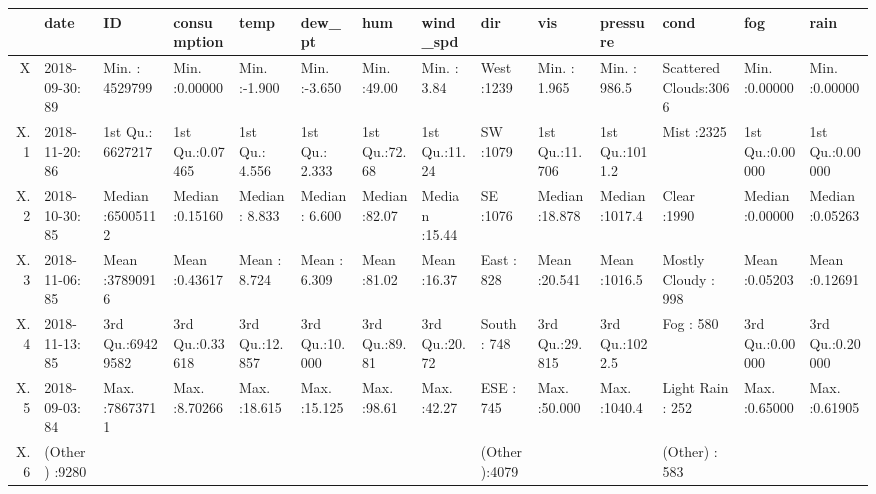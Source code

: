 \begin{table}[ht]
\centering
\begin{tabular}{rlllllllllllll}
  \hline
 &         date &       ID &  consumption &      temp &     dew\_pt &      hum &    wind\_spd &      dir &      vis &    pressure &               cond &      fog &      rain \\ 
  \hline
X & 2018-09-30:  89   & Min.   : 4529799   & Min.   :0.00000   & Min.   :-1.900   & Min.   :-3.650   & Min.   :49.00   & Min.   : 3.84   & West   :1239   & Min.   : 1.965   & Min.   : 986.5   & Scattered Clouds:3066   & Min.   :0.00000   & Min.   :0.00000   \\ 
  X.1 & 2018-11-20:  86   & 1st Qu.: 6627217   & 1st Qu.:0.07465   & 1st Qu.: 4.556   & 1st Qu.: 2.333   & 1st Qu.:72.68   & 1st Qu.:11.24   & SW     :1079   & 1st Qu.:11.706   & 1st Qu.:1011.2   & Mist            :2325   & 1st Qu.:0.00000   & 1st Qu.:0.00000   \\ 
  X.2 & 2018-10-30:  85   & Median :65005112   & Median :0.15160   & Median : 8.833   & Median : 6.600   & Median :82.07   & Median :15.44   & SE     :1076   & Median :18.878   & Median :1017.4   & Clear           :1990   & Median :0.00000   & Median :0.05263   \\ 
  X.3 & 2018-11-06:  85   & Mean   :37890916   & Mean   :0.43617   & Mean   : 8.724   & Mean   : 6.309   & Mean   :81.02   & Mean   :16.37   & East   : 828   & Mean   :20.541   & Mean   :1016.5   & Mostly Cloudy   : 998   & Mean   :0.05203   & Mean   :0.12691   \\ 
  X.4 & 2018-11-13:  85   & 3rd Qu.:69429582   & 3rd Qu.:0.33618   & 3rd Qu.:12.857   & 3rd Qu.:10.000   & 3rd Qu.:89.81   & 3rd Qu.:20.72   & South  : 748   & 3rd Qu.:29.815   & 3rd Qu.:1022.5   & Fog             : 580   & 3rd Qu.:0.00000   & 3rd Qu.:0.20000   \\ 
  X.5 & 2018-09-03:  84   & Max.   :78673711   & Max.   :8.70266   & Max.   :18.615   & Max.   :15.125   & Max.   :98.61   & Max.   :42.27   & ESE    : 745   & Max.   :50.000   & Max.   :1040.4   & Light Rain      : 252   & Max.   :0.65000   & Max.   :0.61905   \\ 
  X.6 & (Other)   :9280   &  &  &  &  &  &  & (Other):4079   &  &  & (Other)         : 583   &  &  \\ 
   \hline
\end{tabular}
\end{table}
